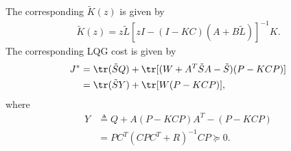   The corresponding $\tilde K(z)$ is given by
  \begin{align*}
    \tilde K(z) =  z\tilde L\left[zI - (I-KC)(A+B\tilde L)\right]^{-1}K.
  \end{align*}
  The corresponding LQG cost is given by
  \begin{align}
    J^*& = \tr(\tilde SQ) + \tr[(W+A^T\tilde SA-\tilde S)(P-KCP)] \nonumber\\
    &= \tr(\tilde S Y)+ \tr[W(P-KCP)] ,
    \label{eq:optlqgcost}
  \end{align}
  where 
  \begin{equation}
    \begin{split}
      Y &\triangleq Q+A(P-KCP)A^T-(P-KCP) \\
      &= PC^T(CPC^T+R)^{-1}CP\succeq 0.
    \end{split}
  \end{equation}

